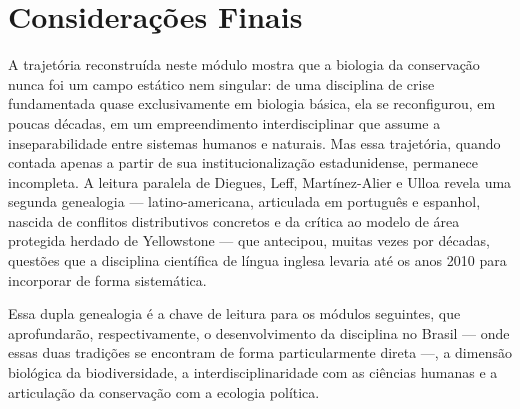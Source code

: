 \documentclass[
  portuguese,
  letterpaper,
  DIV=11,
  numbers=noendperiod]{scrartcl}
\begin{document}
\section{Considerações Finais}\label{considerauxe7uxf5es-finais}

A trajetória reconstruída neste módulo mostra que a biologia da
conservação nunca foi um campo estático nem singular: de uma disciplina
de crise fundamentada quase exclusivamente em biologia básica, ela se
reconfigurou, em poucas décadas, em um empreendimento interdisciplinar
que assume a inseparabilidade entre sistemas humanos e naturais. Mas
essa trajetória, quando contada apenas a partir de sua
institucionalização estadunidense, permanece incompleta. A leitura
paralela de Diegues, Leff, Martínez-Alier e Ulloa revela uma segunda
genealogia --- latino-americana, articulada em português e espanhol,
nascida de conflitos distributivos concretos e da crítica ao modelo de
área protegida herdado de Yellowstone --- que antecipou, muitas vezes
por décadas, questões que a disciplina científica de língua inglesa
levaria até os anos 2010 para incorporar de forma sistemática.

Essa dupla genealogia é a chave de leitura para os módulos seguintes,
que aprofundarão, respectivamente, o desenvolvimento da disciplina no
Brasil --- onde essas duas tradições se encontram de forma
particularmente direta ---, a dimensão biológica da biodiversidade, a
interdisciplinaridade com as ciências humanas e a articulação da
conservação com a ecologia política.
\end{document}
